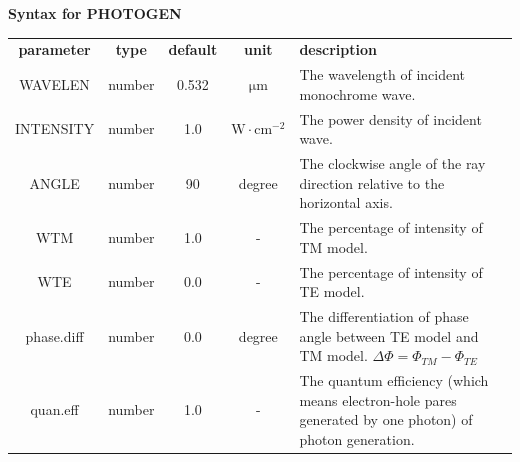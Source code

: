 \documentclass[11pt,pdftex]{article}
\begin{document}
\textbf{Syntax for PHOTOGEN}
\small \noindent\begin{longtable}{ccccp{8cm}}
\textbf{ parameter}   & \textbf{type}         & \textbf{default} & \textbf{unit} & \textbf{description} \\
WAVELEN       & number  & 0.532 & $\mathrm{\mu m}$              & The wavelength of incident monochrome wave.\\
INTENSITY     & number  & 1.0   & $\mathrm{W \cdot cm^{-2}}$    & The power density of incident wave.\\
ANGLE         & number  & 90    & degree                        & The clockwise angle of the ray direction relative to the horizontal axis.\\
WTM           & number  & 1.0   & -                             & The percentage of intensity of TM model.\\
WTE           & number  & 0.0   & -                             & The percentage of intensity of TE model.\\
phase.diff    & number  & 0.0   & degree                        & The differentiation of phase angle between TE model and TM model.
                                                                  $\Delta \Phi=\Phi_{TM}-\Phi_{TE}$\\
quan.eff      & number  & 1.0   & -                             & The quantum efficiency (which means electron-hole pares generated by one photon)
                                                                  of photon generation.\\
\end{longtable}
\normalsize
\end{document}
